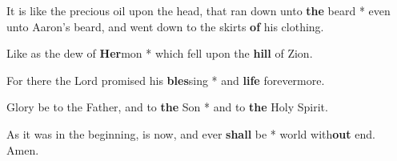 \begin{multicols}{2}
	It is like the precious oil upon the head, that ran down unto \textbf{the} beard * even unto Aaron's beard, and went down to the skirts \textbf{of} his clothing.
	
	Like as the dew of \textbf{Her}mon * which fell upon the \textbf{hill} of Zion.
	
	For there the Lord promised his \textbf{bles}sing * and \textbf{life} forevermore.
	
	Glory be to the Father, and to \textbf{the} Son * and to \textbf{the} Holy Spirit.
	
	As it was in the beginning, is now, and ever \textbf{shall} be * world with\textbf{out} end. Amen.
\end{multicols}